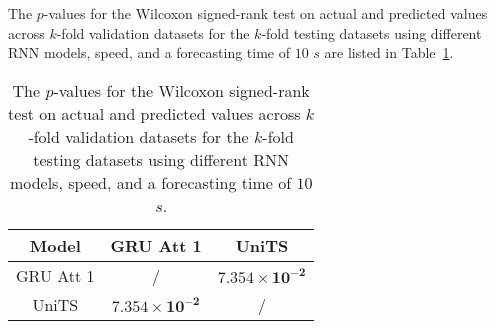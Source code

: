 The $p$-values for the Wilcoxon signed-rank test on actual and predicted values across $k$-fold validation datasets for the $k$-fold testing datasets using different RNN models, speed, and a forecasting time of $10$ $s$ are listed in Table~\ref{tab:speed:p:10}.

\begin{table}[!ht]
	\centering
	\begin{tabular}{|c|c|c|}
		\hline
		Model & GRU Att 1 & UniTS \\ \hline
		GRU Att 1 & / & $\mathbf{7.354 \times 10^{-2}}$ \\ \hline
		UniTS & $\mathbf{7.354 \times 10^{-2}}$ & / \\ \hline
	\end{tabular}
	\caption{The $p$-values for the Wilcoxon signed-rank test on actual and predicted values across $k$-fold validation datasets for the $k$-fold testing datasets using different RNN models, speed, and a forecasting time of $10$ $s$.}
	\label{tab:speed:p:10}
\end{table}

